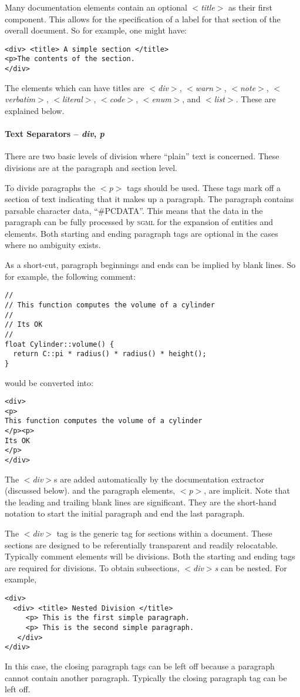 Many documentation elements contain an optional \textit{$<$title$>$} as their first
component. This allows for the specification of a label for that section
of the overall document. So for example, one might have:
\begin{verbatim}
<div> <title> A simple section </title>
<p>The contents of the section.
</div>
\end{verbatim}
\noindent
The elements which can have titles are \textit{$<$div$>$}, \textit{$<$warn$>$}, \textit{$<$note$>$},
\textit{$<$verbatim$>$}, \textit{$<$literal$>$}, \textit{$<$code$>$}, \textit{$<$enum$>$}, and \textit{$<$list$>$}. 
These are explained below.

\paragraph{Text Separators -- \textit{div}, \textit{p}}

There are two basic levels of division where ``plain'' text is concerned.
These divisions are at the paragraph and section level. 

To divide paragraphs the \textit{$<$p$>$} tags should be used. These tags mark off
a section of text indicating that it makes up a paragraph. The paragraph
contains parsable character data, ``\#PCDATA''. This means that the data
in the paragraph can be fully processed by \textsc{sgml} for the expansion of
entities and elements. Both starting and ending paragraph tags are optional 
in the cases where no ambiguity exists.

As a short-cut, paragraph beginnings and ends can be implied by blank
lines. So for example, the following comment:
\begin{verbatim}
//
// This function computes the volume of a cylinder
//
// Its OK
//
float Cylinder::volume() {
  return C::pi * radius() * radius() * height();
}
\end{verbatim}
\noindent
would be converted into:
\begin{verbatim}
<div>
<p>
This function computes the volume of a cylinder
</p><p>
Its OK
</p>
</div>
\end{verbatim}
\noindent
The \textit{$<$div$>$}s are added automatically by the documentation extractor
(discussed below). and the paragraph elements, \textit{$<$p$>$}, are implicit.
Note that the leading and trailing blank lines are significant. They are
the short-hand notation to start the initial paragraph and end the last
paragraph.

The \textit{$<$div$>$} tag is the generic tag for sections within a document. These
sections are designed to be referentially transparent and readily 
relocatable. Typically comment elements will be divisions. Both
the starting and ending tags are required for divisions. To obtain
subsections, \textit{$<$div$>$s} can be nested. For example,
\begin{verbatim}
<div>
  <div> <title> Nested Division </title>
     <p> This is the first simple paragraph.
     <p> This is the second simple paragraph.
   </div>
</div>
\end{verbatim}
\noindent
In this case, the closing paragraph tags can be left off because a 
paragraph cannot contain another paragraph. Typically the closing 
paragraph tag can be left off.

